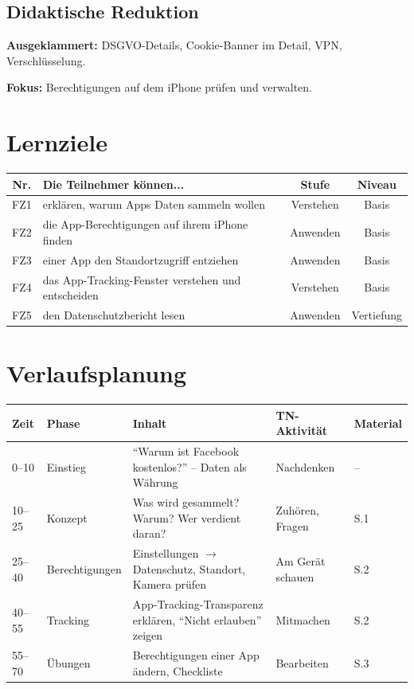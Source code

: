 \documentclass[11pt,a4paper]{article}
\begin{document}
\subsection{Didaktische Reduktion}
\textbf{Ausgeklammert:} DSGVO-Details, Cookie-Banner im Detail, VPN, Verschlüsselung.

\textbf{Fokus:} Berechtigungen auf dem iPhone prüfen und verwalten.

\section{Lernziele}

\begin{tabular}{|c|p{7cm}|c|c|}
\hline
\textbf{Nr.} & \textbf{Die Teilnehmer können...} & \textbf{Stufe} & \textbf{Niveau} \\
\hline
FZ1 & erklären, warum Apps Daten sammeln wollen & Verstehen & Basis \\
FZ2 & die App-Berechtigungen auf ihrem iPhone finden & Anwenden & Basis \\
FZ3 & einer App den Standortzugriff entziehen & Anwenden & Basis \\
FZ4 & das App-Tracking-Fenster verstehen und entscheiden & Verstehen & Basis \\
FZ5 & den Datenschutzbericht lesen & Anwenden & Vertiefung \\
\hline
\end{tabular}

\section{Verlaufsplanung}

\begin{longtable}{|p{1cm}|p{2cm}|p{5cm}|p{3cm}|p{2cm}|}
\hline
\textbf{Zeit} & \textbf{Phase} & \textbf{Inhalt} & \textbf{TN-Aktivität} & \textbf{Material} \\
\hline
0--10 & Einstieg & ``Warum ist Facebook kostenlos?'' -- Daten als Währung & Nachdenken & -- \\
\hline
10--25 & Konzept & Was wird gesammelt? Warum? Wer verdient daran? & Zuhören, Fragen & S.1 \\
\hline
25--40 & Berechtigungen & Einstellungen $\rightarrow$ Datenschutz, Standort, Kamera prüfen & Am Gerät schauen & S.2 \\
\hline
40--55 & Tracking & App-Tracking-Transparenz erklären, ``Nicht erlauben'' zeigen & Mitmachen & S.2 \\
\hline
55--70 & Übungen & Berechtigungen einer App ändern, Checkliste & Bearbeiten & S.3 \\
\hline
\end{longtable}
\end{document}
